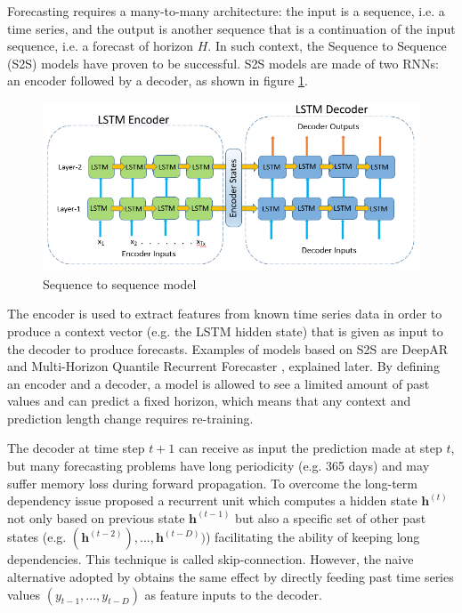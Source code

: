 \documentclass[a4paper, 12pt]{article} %
\begin{document}
	Forecasting requires a many-to-many architecture: the input is a sequence, i.e. a time series, and the output is another sequence that is a continuation of the input sequence, i.e. a forecast of horizon $H$. In such context, the Sequence to Sequence (S2S) \cite{seq2seq} models have proven to be successful. S2S models are made of two RNNs: an encoder followed by a decoder, as shown in figure \ref{fig:seq2seq}.
	\begin{figure}
		\includegraphics[width=\linewidth]{img/seq2seq.png}
		\caption{Sequence to sequence model}
		\label{fig:seq2seq}
	\end{figure}
	 The encoder is used to extract features from known time series data in order to produce a context vector (e.g. the LSTM hidden state) that is given as input to the decoder to produce forecasts. Examples of models based on S2S are DeepAR \cite{DeepAR} and Multi-Horizon Quantile Recurrent Forecaster \cite{MQCNN}, explained later. By defining an encoder and a decoder, a model is allowed to see a limited amount of past values and can predict a fixed horizon, which means that any context and prediction length change requires re-training. 
	 
	 The decoder at time step $t+1$ can receive as input the prediction made at step $t$, but many forecasting problems have long periodicity (e.g. 365 days) and may suffer memory loss during forward propagation. To overcome the long-term dependency issue \cite{NARX} proposed a recurrent unit which computes a hidden state $\pmb{h}^{(t)}$ not only based on previous state $\pmb{h}^{(t-1)}$ but also a specific set of other past states (e.g. $(\pmb{h}^{(t-2)}), ..., \pmb{h}^{(t-D)})$) facilitating the ability of keeping long dependencies. This technique is called skip-connection. However, the naive alternative adopted by \cite{DeepAR, MQCNN} obtains the same effect by directly feeding past time series values $(y_{t-1}, ..., y_{t-D})$ as feature inputs to the decoder.
	
\end{document}
